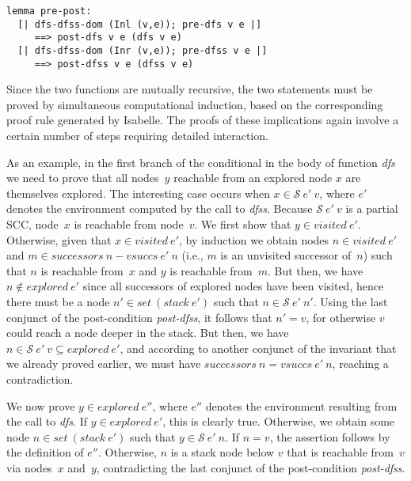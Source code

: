 \documentclass[sigplan,10pt,anonymous,review]{acmart}
\newcommand{\prog}[1]{\textit{#1}}
\renewcommand{\SS}{\mathcal{S}}
\begin{document}
\begin{small}
\begin{lstlisting}[language=isabelle]
lemma pre-post:
  [| dfs-dfss-dom (Inl (v,e)); pre-dfs v e |] 
     ==> post-dfs v e (dfs v e)
  [| dfs-dfss-dom (Inr (v,e)); pre-dfss v e |]
     ==> post-dfss v e (dfss v e)
\end{lstlisting}
\end{small}

Since the two functions are mutually recursive, the two statements must be proved by simultaneous computational induction, based on the corresponding proof rule generated by Isabelle. The proofs of these implications again involve a certain number of steps requiring detailed interaction.

As an example, in the first branch of the conditional in the body of function \prog{dfs} we need to prove that all nodes~$y$ reachable from an explored node $x$ are themselves explored. The interesting case occurs when $x \in \SS~e'~v$, where $e'$ denotes the environment computed by the call to \prog{dfss}. Because $\SS~e'~v$ is a partial SCC, node~$x$ is reachable from node~$v$. We first show that $y \in \prog{visited}~e'$. Otherwise, given that $x \in \prog{visited}~e'$, by induction we obtain nodes $n \in \prog{visited}~e'$ and $m \in \prog{successors}~n - \prog{vsuccs}~e'~n$ (i.e., $m$ is an unvisited successor of~$n$) such that $n$ is reachable from~$x$ and $y$ is reachable from~$m$. But then, we have $n \notin \prog{explored}~e'$ since all successors of explored nodes have been visited, hence there must be a node $n' \in \prog{set}~(\prog{stack}~e')$ such that $n \in \SS~e'~n'$. Using the last conjunct of the post-condition \prog{post-dfss}, it follows that $n' = v$, for otherwise $v$ could reach a node deeper in the stack. But then, we have $n \in \SS~e'~v \subseteq \prog{explored}~e'$, and according to another conjunct of the invariant that we already proved earlier, we must have $\prog{successors}~n = \prog{vsuccs}~e'~n$, reaching a contradiction.

We now prove $y \in \prog{explored}~e''$, where $e''$ denotes the environment resulting from the call to \prog{dfs}. If $y \in \prog{explored}~e'$, this is clearly true. Otherwise, we obtain some node $n \in \prog{set}~(\prog{stack}~e')$ such that $y \in \SS~e'~n$. If $n=v$, the assertion follows by the definition of $e''$. Otherwise, $n$ is a stack node below $v$ that is reachable from~$v$ via nodes~$x$ and~$y$, contradicting the last conjunct of the post-condition \prog{post-dfss}.
\end{document}
